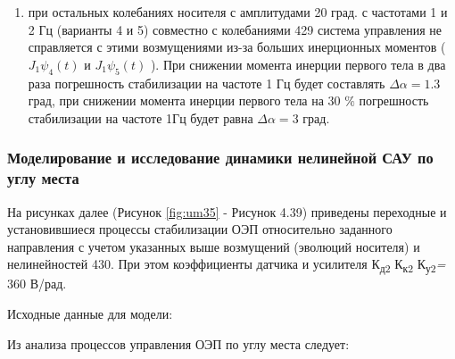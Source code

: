 \begin{enumerate}
	
	\item при остальных колебаниях носителя с амплитудами 20 град. с частотами 1 и  2  Гц (варианты 4 и 5) совместно с колебаниями  429 система управления не справляется с этими возмущениями из-за больших инерционных моментов ( \( J_{1} \psi _{4} \left( t \right)  \)  и  \( J_{1} \psi _{5} \left( t \right)  \) ). При снижении  момента инерции первого тела в два раза погрешность стабилизации на частоте  1 Гц будет составлять   $\varDelta\alpha=1.3$ град, при снижении момента инерции первого тела на 30 $\%$  погрешность стабилизации на частоте 1Гц будет равна $\varDelta\alpha=3$  град.
\end{enumerate}


\subsubsection{Моделирование и исследование динамики нелинейной САУ по углу места} \label{subsec:ch4/sect6/sub2}


На рисунках далее (Рисунок \ref{fig:um35} - Рисунок 4.39) приведены переходные и установившиеся процессы стабилизации ОЭП относительно заданного направления с учетом указанных выше возмущений (эволюций носителя) и нелинейностей 430. При этом коэффициенты датчика и усилителя К\textsubscript{д2 }К\textsubscript{к2} К\textsubscript{у2}\textit{= }360 В/рад. \par

Исходные данные для модели:

\begingroup
\captiondelim{ } %

\endgroup

Из анализа процессов управления ОЭП по углу места следует:\par


